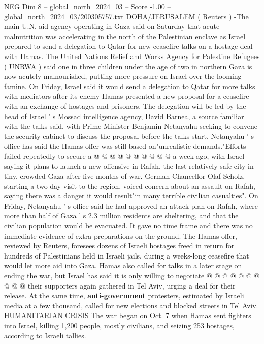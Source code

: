 \begin{textsample}{NEG Dim 8 – global\_north\_2024\_03 – Score -1.00 – global\_north\_2024\_03/200305757.txt}  \label{ex:f8_neg_223}
DOHA/JERUSALEM ( Reuters ) -The main U.N. aid agency operating in Gaza said on Saturday that acute malnutrition was accelerating in the north of the Palestinian enclave as Israel prepared to send a delegation to Qatar for new ceasefire talks on a hostage deal with Hamas.
The United Nations Relief and Works Agency for Palestine Refugees ( UNRWA ) said one in three children under the age of two in northern Gaza is now acutely malnourished, putting more pressure on Israel over the looming famine.
On Friday, Israel said it would send a delegation to Qatar for more talks with mediators after its enemy Hamas presented a new proposal for a ceasefire with an exchange of hostages and prisoners.
The delegation will be led by the head of Israel ' s Mossad intelligence agency, David Barnea, a source familiar with the talks said, with Prime Minister Benjamin Netanyahu seeking to convene the security cabinet to discuss the proposal before the talks start.
Netanyahu ' s office has said the Hamas offer was still based on"unrealistic demands."Efforts failed repeatedly to secure a @ @ @ @ @ @ @ @ @ @ a week ago, with Israel saying it plans to launch a new offensive in Rafah, the last relatively safe city in tiny, crowded Gaza after five months of war.
German Chancellor Olaf Scholz, starting a two-day visit to the region, voiced concern about an assault on Rafah, saying there was a danger it would result"in many terrible civilian casualties".
On Friday, Netanyahu ' s office said he had approved an attack plan on Rafah, where more than half of Gaza ' s 2.3 million residents are sheltering, and that the civilian population would be evacuated.
It gave no time frame and there was no immediate evidence of extra preparations on the ground.
The Hamas offer, reviewed by Reuters, foresees dozens of Israeli hostages freed in return for hundreds of Palestinians held in Israeli jails, during a weeks-long ceasefire that would let more aid into Gaza.
Hamas also called for talks in a later stage on ending the war, but Israel has said it is only willing to negotiate @ @ @ @ @ @ @ @ @ @ their supporters again gathered in Tel Aviv, urging a deal for their release.
At the same time, \textbf{anti-government} protesters, estimated by Israeli media at a few thousand, called for new elections and blocked streets in Tel Aviv.
HUMANITARIAN CRISIS The war began on Oct. 7 when Hamas sent fighters into Israel, killing 1,200 people, mostly civilians, and seizing 253 hostages, according to Israeli tallies.

\end{textsample}
